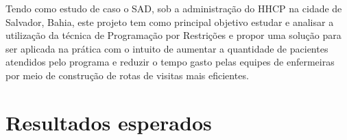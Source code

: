 { }%


Tendo como estudo de caso o \ac{SAD}, sob a administração do \ac{HHCP} na cidade de Salvador, Bahia, este projeto tem como principal objetivo estudar e analisar a utilização da técnica de Programação por Restrições e propor uma solução para ser aplicada na prática com o intuito de aumentar a quantidade de pacientes atendidos pelo programa e reduzir o tempo gasto pelas equipes de enfermeiras por meio de construção de rotas de visitas mais eficientes.


\section{Resultados esperados}

